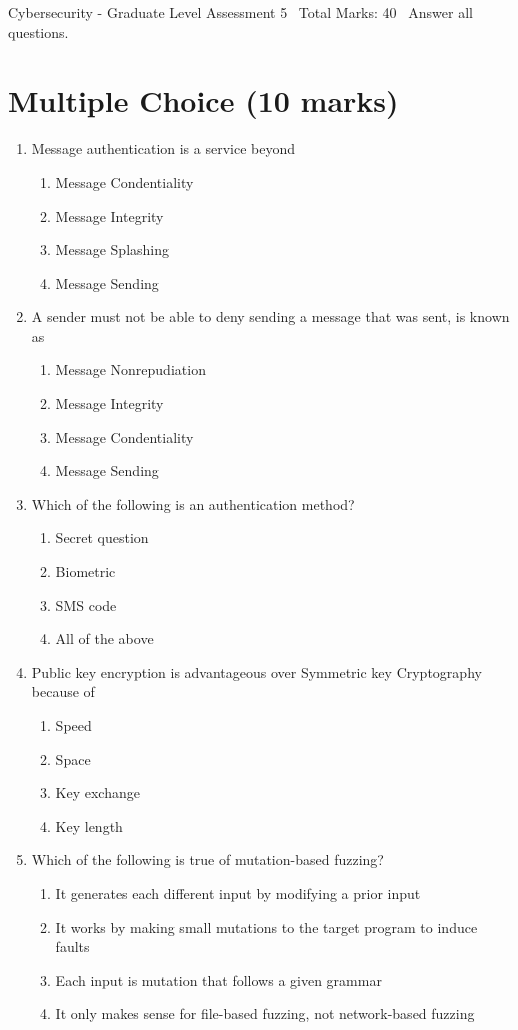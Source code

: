 \documentclass[12pt]{article}
\begin{document}
\begin{center}
Cybersecurity - Graduate Level Assessment 5 \
Total Marks: 40 \
Answer all questions.
\end{center}

\section*{Multiple Choice (10 marks)}
\begin{enumerate}[label=\arabic*.]
\item Message authentication is a service beyond
\begin{enumerate}[label=(\alph*)]
    \item Message Condentiality
    \item Message Integrity
    \item Message Splashing
    \item Message Sending
\end{enumerate}
\item A sender must not be able to deny sending a message that was sent, is known as
\begin{enumerate}[label=(\alph*)]
    \item Message Nonrepudiation
    \item Message Integrity
    \item Message Condentiality
    \item Message Sending
\end{enumerate}
\item Which of the following is an authentication method?
\begin{enumerate}[label=(\alph*)]
    \item Secret question
    \item Biometric
    \item SMS code
    \item All of the above
\end{enumerate}
\item Public key encryption is advantageous over Symmetric key Cryptography because of
\begin{enumerate}[label=(\alph*)]
    \item Speed
    \item Space
    \item Key exchange
    \item Key length
\end{enumerate}
\item Which of the following is true of mutation-based fuzzing?
\begin{enumerate}[label=(\alph*)]
    \item It generates each different input by modifying a prior input
    \item It works by making small mutations to the target program to induce faults
    \item Each input is mutation that follows a given grammar
    \item It only makes sense for file-based fuzzing, not network-based fuzzing
\end{enumerate}
\end{enumerate}
\end{document}
